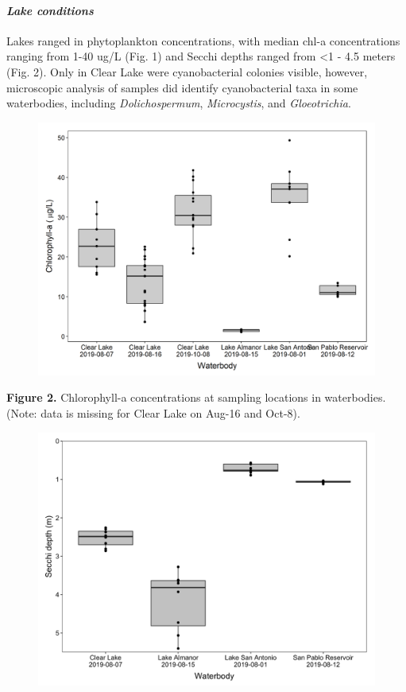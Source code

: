 \documentclass[]{article}
\let\oldparagraph\paragraph
\renewcommand{\paragraph}[1]{\oldparagraph{#1}\mbox{}}
\begin{document}
\hypertarget{lake-conditions}{%
\paragraph{\texorpdfstring{\emph{Lake
conditions}}{Lake conditions}}\label{lake-conditions}}

Lakes ranged in phytoplankton concentrations, with median chl-a
concentrations ranging from 1-40 ug/L (Fig. 1) and Secchi depths ranged
from \textless1 - 4.5 meters (Fig. 2). Only in Clear Lake were
cyanobacterial colonies visible, however, microscopic analysis of
samples did identify cyanobacterial taxa in some waterbodies, including
\emph{Dolichospermum}, \emph{Microcystis}, and \emph{Gloeotrichia}.

\begin{figure}

{\centering \includegraphics[width=0.6\linewidth]{../Data/Figures_output/chla} 

}

\end{figure}

\textbf{Figure 2.} Chlorophyll-a concentrations at sampling locations in
waterbodies. (Note: data is missing for Clear Lake on Aug-16 and Oct-8).

\begin{figure}

{\centering \includegraphics[width=0.6\linewidth]{../Data/Figures_output/secchi} 

}

\end{figure}
\end{document}
